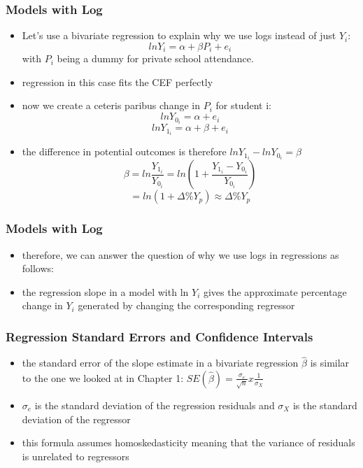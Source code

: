 \documentclass{beamer}
\begin{document}
\begin{frame}
\frametitle{Models with Log}
	\begin{itemize}
		\item Let's use a bivariate regression to explain why we use logs instead of just $Y_i$: $$ln Y_i = \alpha + \beta P_i + e_i $$ with $P_i$ being a dummy for private school attendance.
		\item regression in this case fits the CEF perfectly
		\item now we create a ceteris paribus change in $P_i$ for student i: $$ln Y_0_i = \alpha + e_i $$ $$ln Y_1_i = \alpha + \beta + e_i$$
		\item the difference in potential outcomes is therefore $ ln Y_1_i - ln Y_0_i = \beta$
		$$\beta = ln \frac{Y_1_i}{Y_0_i} = ln ( 1+ \frac{Y_1_i - Y_0_i}{Y_0_i} ) $$
		$$= ln ( 1 + \Delta \% Y_p ) \approx \Delta \% Y_p$$
	
	\end{itemize}

\end{frame}

\begin{frame}
\frametitle{Models with Log}
	\begin{itemize}
		\item therefore, we can answer the question of why we use logs in regressions as follows:
		\item the regression slope in a model with ln $Y_i$ gives the approximate percentage change in $Y_i$ generated by changing the corresponding regressor
	\end{itemize}

\end{frame}


\begin{frame}
\frametitle{Regression Standard Errors and Confidence Intervals}
	\begin{itemize}
		\item the standard error of the slope estimate in a bivariate regression $\hat{\beta}$ is similar to the one we looked at in Chapter 1: $SE(\hat{\beta}) = \frac{\sigma _ e}{\sqrt{n}} x \frac{1}{ \sigma_X}$
		\item $\sigma_e$ is the standard deviation of the regression residuals and $\sigma_X$ is the standard deviation of the regressor
		 \item this formula assumes homoskedasticity meaning that the variance of residuals is unrelated to regressors
	\end{itemize}

\end{frame}
\end{document}

